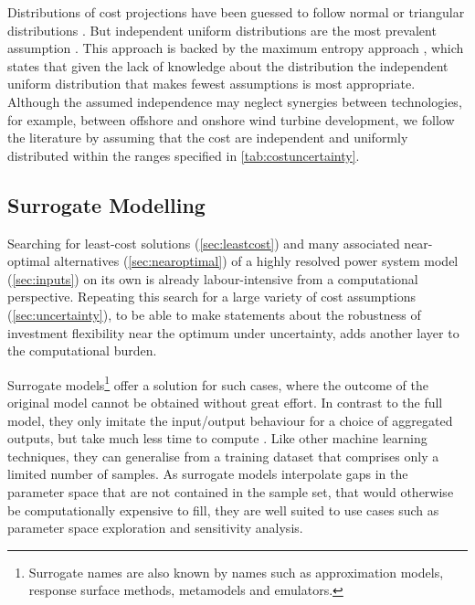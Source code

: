 Distributions of cost projections have been guessed
to follow normal \cite{mavromatidis_uncertainty_2018} or triangular distributions \cite{li_using_2020}.
But independent uniform distributions are the most prevalent assumption \cite{moret_characterization_2017,moret_robust_2016,shirizadeh_how_2019,trondle_trade-offs_2020,pilpola_analyzing_2020,Li2017,Trutnevyte2013,lopion_cost_2019}.
This approach is backed by the maximum entropy approach \cite{trondle_trade-offs_2020}, which states that given the lack of knowledge about the distribution
the independent uniform distribution that makes fewest assumptions is most appropriate.
Although the assumed independence may neglect synergies between technologies,
for example, between offshore and onshore wind turbine development,
we follow the literature by assuming that the cost are independent and uniformly distributed within the ranges specified in \cref{tab:costuncertainty}.

\subsection{Surrogate Modelling}
\label{sec:surrogate}


Searching for least-cost solutions (\cref{sec:leastcost}) and many associated near-optimal alternatives (\cref{sec:nearoptimal}) of a highly resolved power system model (\cref{sec:inputs}) on its own
is already labour-intensive from a computational perspective.
Repeating this search for a large variety of cost assumptions (\cref{sec:uncertainty}), 
to be able to make statements about the robustness of
investment flexibility near the optimum under uncertainty,
adds another layer to the computational burden.


Surrogate models\footnote{Surrogate names are also known by names such as approximation models, response surface methods, metamodels and emulators.}
offer a solution for such cases, where the outcome of the
original model cannot be obtained without great effort.
In contrast to the full model, they only imitate the input/output behaviour for a choice of aggregated outputs, but take much less time to compute \cite{palar_multi-fidelity_2016}.
Like other machine learning techniques, they can generalise from a
training dataset that comprises only a limited number of samples.
As surrogate models interpolate gaps in the parameter space that are not contained in the sample set,
that would otherwise be computationally expensive to fill,
they are well suited to use cases such as parameter space exploration and sensitivity analysis.

